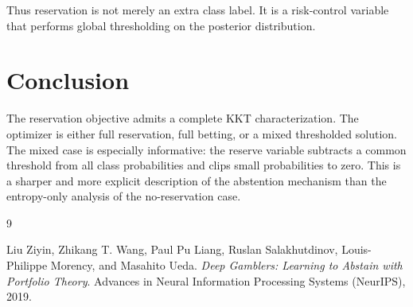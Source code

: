 \documentclass[11pt]{article}
\theoremstyle{remark}
\begin{document}
Thus reservation is not merely an extra class label. It is a risk-control variable that performs global thresholding on the posterior distribution.

\section{Conclusion}

The reservation objective admits a complete KKT characterization.
The optimizer is either full reservation, full betting, or a mixed thresholded solution.
The mixed case is especially informative: the reserve variable subtracts a common threshold from all class probabilities and clips small probabilities to zero.
This is a sharper and more explicit description of the abstention mechanism than the entropy-only analysis of the no-reservation case.

\begin{thebibliography}{9}

Liu Ziyin, Zhikang T. Wang, Paul Pu Liang, Ruslan Salakhutdinov,
Louis-Philippe Morency, and Masahito Ueda.
\newblock \emph{Deep Gamblers: Learning to Abstain with Portfolio Theory}.
\newblock Advances in Neural Information Processing Systems (NeurIPS), 2019.

\end{thebibliography}
\end{document}

